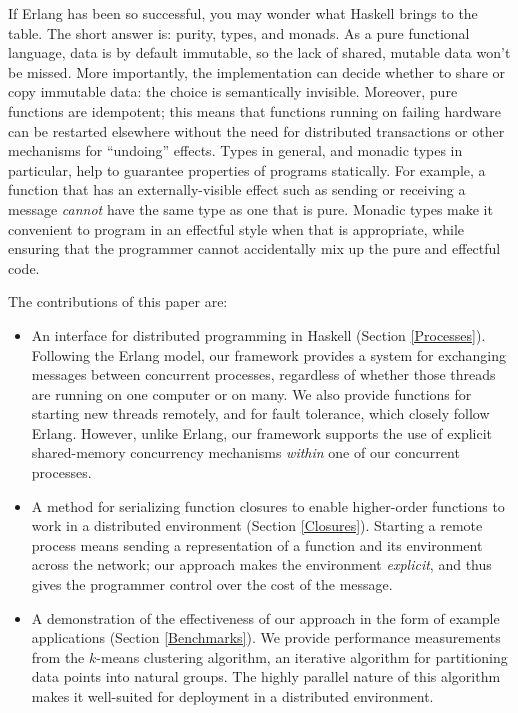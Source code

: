 \documentclass[preprint]{sigplanconf}
\begin{document}
If Erlang has been so successful, you may wonder what Haskell brings to the table. 
The short answer is: purity, types, and monads.  As a pure functional language, data is by default immutable, so the lack of shared, mutable data won't be missed.  More importantly, the implementation can decide whether to share or copy immutable data: the choice is semantically invisible. 
Moreover, pure functions are idempotent; this means that functions running on failing hardware can be restarted elsewhere without the need for distributed transactions or other mechanisms for ``undoing'' effects.  
Types in general, and monadic types in particular, help to guarantee properties of programs statically.  
For example, a function that has an externally-visible effect such as sending or receiving a message \emph{cannot} have the same type as one that is pure.
Monadic types make it convenient to program in an effectful style when that is appropriate, while ensuring that the programmer cannot accidentally mix up the pure and effectful code.

The contributions of this paper are:
\begin{itemize}
\item An interface for distributed programming in Haskell (Section \ref{Processes}). Following the Erlang model, our framework provides a system for exchanging messages between concurrent processes, regardless of whether those threads are running on one computer or on many. We also provide functions for starting new threads remotely, and for fault tolerance, which closely follow Erlang. 
However, unlike Erlang, our framework supports the use of explicit shared-memory concurrency mechanisms \emph{within} one of our concurrent processes.

\item A method for serializing function closures to enable higher-order functions to work in a distributed environment (Section \ref{Closures}). Starting a remote process means sending a representation of a function and its environment across the network;  our approach makes the environment \emph{explicit}, and thus gives the programmer control over the cost of the message.

\item A demonstration of the effectiveness of our approach in the form of example applications (Section \ref{Benchmarks}). We provide performance measurements from the $k$-means clustering algorithm, an iterative algorithm for partitioning data points into natural groups. The highly parallel nature of this algorithm makes it well-suited for deployment in a distributed environment.
\end{itemize}
\end{document}
